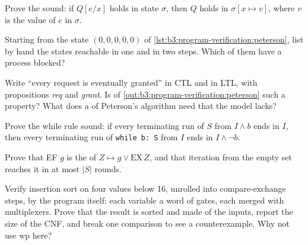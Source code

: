 \begin{exercise}[$\star\star$]\label{exo:b3:program-verification:7}
Prove the  sound: if $Q[e/x]$ holds in state $\sigma$, then $Q$ holds in $\sigma[x \mapsto v]$, where $v$ is the value of $e$ in $\sigma$.
\end{exercise}

\begin{exercise}[$\star\star$]\label{exo:b3:program-verification:8}
Starting from the state $(0, 0, 0, 0, 0)$ of \cref{lst:b3:program-verification:peterson}, list by hand the states reachable in one and in two steps. Which of them have a process blocked?
\end{exercise}

\begin{exercise}[$\star\star$]\label{exo:b3:program-verification:9}
Write ``every request is eventually granted'' in CTL and in LTL, with propositions \textit{req} and \textit{grant}. Is  of \cref{out:b3:program-verification:peterson} such a property? What does a  of Peterson's algorithm need that the model lacks?
\end{exercise}

\begin{exercise}[$\star\star\star$]\label{exo:b3:program-verification:10}
Prove the while rule sound: if every terminating run of $S$ from $I \wedge b$ ends in $I$, then every terminating run of \texttt{while b:\ S} from $I$ ends in $I \wedge \neg b$.
\end{exercise}

\begin{exercise}[$\star\star\star$]\label{exo:b3:program-verification:11}
Prove that EF $g$ is the  of $Z \mapsto g \vee \mathrm{EX}\,Z$, and that iteration from the empty set reaches it in at most $|S|$ rounds.
\end{exercise}

\begin{exercise}[$\star\star\star$]\label{exo:b3:program-verification:12}
Verify insertion sort on four values below 16, unrolled into compare-exchange steps, by  the program itself: each variable a word of gates, each  merged with multiplexers. Prove that the result is sorted and made of the inputs, report the size of the CNF, and break one comparison to see a counterexample. Why not use wp here?
\end{exercise}

